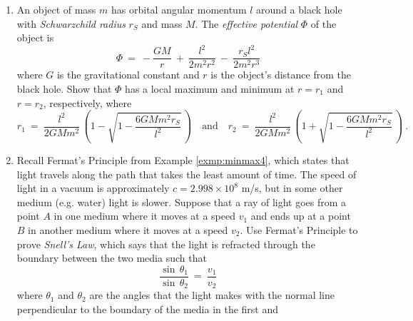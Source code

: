 {\begin{enumerate}[\bfseries 1.]
\emph{nucleons}---protons and neutrons---in the star, $q$ is the charge of an
electron, $m$ is the mass of an electron, $M$ is the mass of a nucleon, $G$ is
the gravitational constant, and $R$ is the radius of the star. Show that the
radius $R$ that minimizes $E$ is
\[
R ~=~ \left(\frac{9 \pi}{4}\right)^{2/3}\,\frac{\hbar^2 q^{5/3}}{GmM^2 N^{1/3}} ~.
\]
[{[\bfseries 1.]}]
 \item An object of mass $m$ has orbital angular momentum $l$ around a black
  hole with \emph{Schwarzchild radius} $r_S$ and mass $M$. The
  \emph{effective potential} $\Phi$ of the object is
\[
\Phi ~=~ -\frac{GM}{r} ~+~ \frac{l^2}{2m^2r^2} ~-~ \frac{r_S l^2}{2m^2r^3}
\]
where $G$ is the gravitational constant and $r$ is the object's distance from
the black hole. Show that $\Phi$ has a local maximum and minimum at $r=r_1$ and
$r=r_2$, respectively, where
\[
r_1 ~=~ \frac{l^2}{2GMm^2}\,\left(1 - \sqrt{1 - \frac{6GMm^2r_S}{l^2}}\,\right)
\quad\text{and}\quad
r_2 ~=~ \frac{l^2}{2GMm^2}\,\left(1 + \sqrt{1 - \frac{6GMm^2r_S}{l^2}}\,\right) ~.
\]
 \item Recall Fermat's Principle from Example
  \ref{exmp:minmax4}, which states that light travels along the path that takes
  the least amount of time. The speed of light in a vacuum is approximately
  $c = 2.998 \times 10^8$ m/s, but in some other medium (e.g. water) light is
  slower. Suppose that a ray of light goes from a point $A$ in one
  medium where it moves at a speed $v_1$ and ends up at a point $B$ in another
  medium where it moves at a speed $v_2$. Use Fermat's Principle to prove
  \emph{Snell's Law}, which says that the light is refracted
  through the boundary between the two media such that
\[
\frac{\sin\,\theta_1}{\sin\,\theta_2} ~=~ \frac{v_1}{v_2}
\]
where $\theta_1$ and $\theta_2$ are the angles that the light makes with the
normal line perpendicular to the boundary of the media in the first and

\end{enumerate}}
